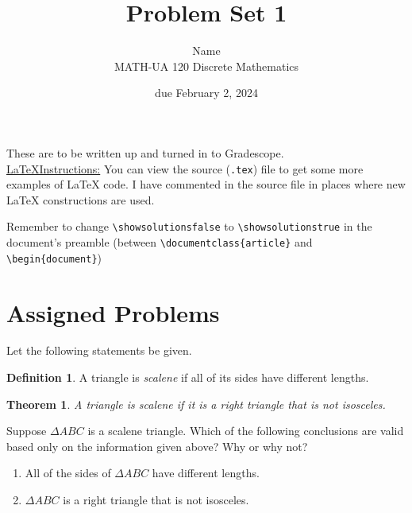 \documentclass{article}
\title{Problem Set 1}
\author{%
    Name
\\  MATH-UA 120 Discrete Mathematics
}
\date{due February 2, 2024}
\newif\ifshowsolutions
\newcommand{\danger}{\marginpar[\hfill\dbend]{\dbend\hfill}}
\newtheorem*{theorem}{Theorem}
\theoremstyle{definition}
\newtheorem*{definition}{Definition}
\begin{document}
\maketitle



These are to be written up and turned in to Gradescope.\\



\ifshowsolutions
    \SetupExSheets{solution/print=true}
\else
    \danger
 \underline{ \LaTeX  Instructions:}  You can view the source (\texttt{.tex}) file to get some more examples of \LaTeX{} code.  I have commented in the source file in places where new \LaTeX{} constructions are used.
  
  Remember to change \verb|\showsolutionsfalse| to \verb|\showsolutionstrue|
    in the document's preamble 
    (between \verb|\documentclass{article}| and \verb|\begin{document}|)
\fi

\section*{Assigned Problems}


\begin{question}{4}
    Let the following statements be given. 
       \begin{definition}
          A triangle is \emph{scalene} if all of its sides have different lengths.
       \end{definition}
       \begin{theorem}
          A triangle is scalene if it is a right triangle that is not isosceles.
       \end{theorem}
    Suppose $\Delta ABC$ is a scalene triangle. 
    Which of the following conclusions are valid based only on the information given above? 
    Why or why not?
    \begin{enumerate}
        \item All of the sides of $\Delta ABC$ have different lengths.
        \item $\Delta ABC$ is a right triangle that is not isosceles.
    \end{enumerate}
\end{question}
\begin{solution}
\end{solution}
\end{document}
